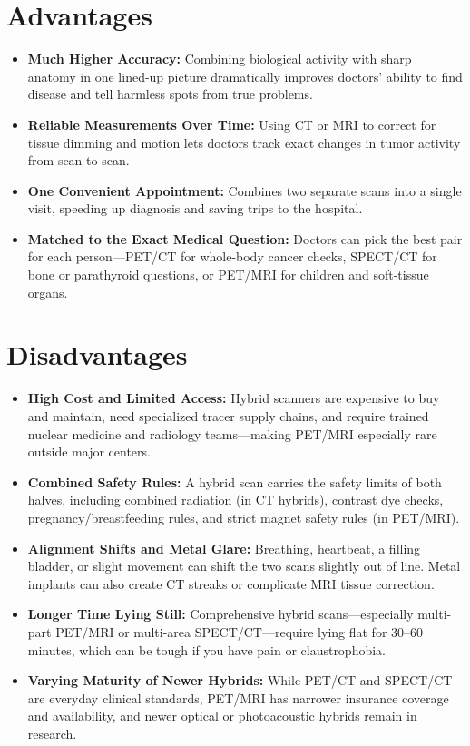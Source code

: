 \section{Advantages}
\begin{itemize}
    \item \textbf{Much Higher Accuracy:} Combining biological activity with sharp anatomy in one lined-up picture dramatically improves doctors' ability to find disease and tell harmless spots from true problems.
    \item \textbf{Reliable Measurements Over Time:} Using CT or MRI to correct for tissue dimming and motion lets doctors track exact changes in tumor activity from scan to scan.
    \item \textbf{One Convenient Appointment:} Combines two separate scans into a single visit, speeding up diagnosis and saving trips to the hospital.
    \item \textbf{Matched to the Exact Medical Question:} Doctors can pick the best pair for each person---PET/CT for whole-body cancer checks, SPECT/CT for bone or parathyroid questions, or PET/MRI for children and soft-tissue organs.
\end{itemize}

\section{Disadvantages}
\begin{itemize}
    \item \textbf{High Cost and Limited Access:} Hybrid scanners are expensive to buy and maintain, need specialized tracer supply chains, and require trained nuclear medicine and radiology teams---making PET/MRI especially rare outside major centers.
    \item \textbf{Combined Safety Rules:} A hybrid scan carries the safety limits of both halves, including combined radiation (in CT hybrids), contrast dye checks, pregnancy/breastfeeding rules, and strict magnet safety rules (in PET/MRI).
    \item \textbf{Alignment Shifts and Metal Glare:} Breathing, heartbeat, a filling bladder, or slight movement can shift the two scans slightly out of line. Metal implants can also create CT streaks or complicate MRI tissue correction.
    \item \textbf{Longer Time Lying Still:} Comprehensive hybrid scans---especially multi-part PET/MRI or multi-area SPECT/CT---require lying flat for 30--60 minutes, which can be tough if you have pain or claustrophobia.
    \item \textbf{Varying Maturity of Newer Hybrids:} While PET/CT and SPECT/CT are everyday clinical standards, PET/MRI has narrower insurance coverage and availability, and newer optical or photoacoustic hybrids remain in research.
\end{itemize}

